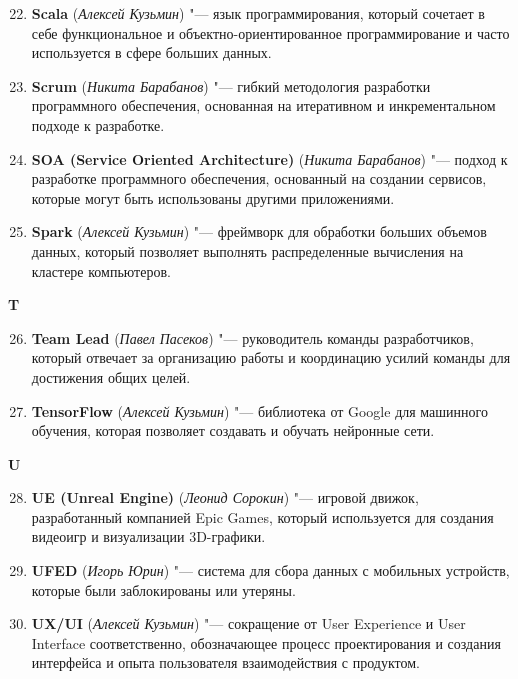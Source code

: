 \begin{enumerate}
    \setcounter{enumi}{21}

    \item \textbf{Scala} (\textit{Алексей Кузьмин}) "--- 
    язык программирования, который сочетает в себе функциональное и объектно-ориентированное программирование и часто используется в сфере больших данных.  

    \item \textbf{Scrum} (\textit{Никита Барабанов}) "--- 
    гибкий методология разработки программного обеспечения, основанная на итеративном и инкрементальном подходе к разработке.  

    \item \textbf{SOA (Service Oriented Architecture)} (\textit{Никита Барабанов}) "--- 
    подход к разработке программного обеспечения, основанный на создании сервисов, которые могут быть использованы другими приложениями.

    \item \textbf{Spark} (\textit{Алексей Кузьмин}) "--- 
    фреймворк для обработки больших объемов данных, который позволяет выполнять распределенные вычисления на кластере компьютеров.
\end{enumerate}

\begin{flushleft} \large\textbf{T} \end{flushleft}

\begin{enumerate}
    \setcounter{enumi}{25}

    \item \textbf{Team Lead} (\textit{Павел Пасеков}) "--- 
    руководитель команды разработчиков, который отвечает за организацию работы и координацию усилий команды для достижения общих целей. 

    \item \textbf{TensorFlow} (\textit{Алексей Кузьмин}) "--- 
    библиотека от Google для машинного обучения, которая позволяет создавать и обучать нейронные сети.  
\end{enumerate}

\begin{flushleft} \large\textbf{U} \end{flushleft}

\begin{enumerate}
    \setcounter{enumi}{27}

    \item \textbf{UE (Unreal Engine)} (\textit{Леонид Сорокин}) "--- 
    игровой движок, разработанный компанией Epic Games, который используется для создания видеоигр и визуализации 3D-графики. 

    \item \textbf{UFED} (\textit{Игорь Юрин}) "--- 
    система для сбора данных с мобильных устройств, которые были заблокированы или утеряны.
    
    \item \textbf{UX/UI} (\textit{Алексей Кузьмин}) "--- 
    сокращение от User Experience и User Interface соответственно, обозначающее процесс проектирования и создания интерфейса и опыта пользователя взаимодействия с продуктом.
\end{enumerate}

